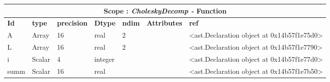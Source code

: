 \documentclass{report}
\begin{document}
\begin{center}
\begin{longtable}{|p{3.5cm}|p{1.5cm}|p{1.5cm}|p{1.5cm}|p{1cm}|p{2cm}|p{4cm}| }
\hline
\multicolumn{7}{|c|}{\textbf{Scope : \qquad}  \textbf{\textit{CholeskyDecomp - }Function}}\\ 
\hline
\textbf{Id} & \textbf{type} & \textbf{precision} & \textbf{Dtype} & \textbf{ndim} & \textbf{Attributes} & \textbf{ref} \\\hline

A & Array & 16 & real & 2 &  & <ast.Declaration object at 0x14b57f1e75d0> \\\hline

L & Array & 16 & real & 2 &  & <ast.Declaration object at 0x14b57f1e7790> \\\hline

i & Scalar & 4 & integer &  &  & <ast.Declaration object at 0x14b57f1e77d0> \\\hline

summ & Scalar & 16 & real &  &  & <ast.Declaration object at 0x14b57f1e7b50> \\\hline

\end{longtable}
\end{center}

 \vspace{1cm}
\end{document}

